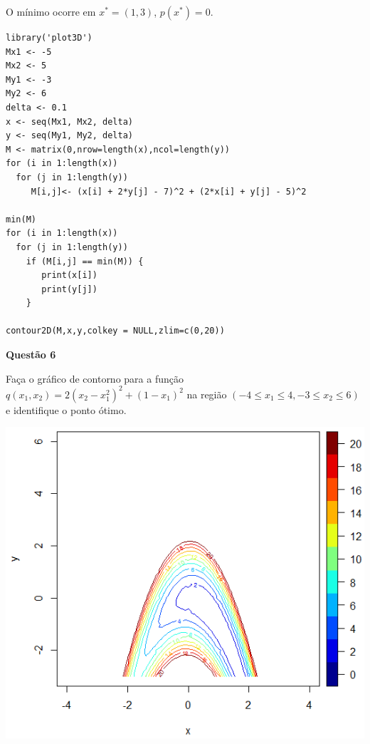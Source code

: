 \documentclass{rbfin}
\begin{document}
O mínimo ocorre em $x^* = (1,3)$, $p(x^*) = 0$.

\singlespacing

\newpage

\begin{verbatim}
library('plot3D')
Mx1 <- -5
Mx2 <- 5
My1 <- -3
My2 <- 6
delta <- 0.1
x <- seq(Mx1, Mx2, delta)
y <- seq(My1, My2, delta)
M <- matrix(0,nrow=length(x),ncol=length(y))
for (i in 1:length(x))
  for (j in 1:length(y))
     M[i,j]<- (x[i] + 2*y[j] - 7)^2 + (2*x[i] + y[j] - 5)^2

min(M)
for (i in 1:length(x))
  for (j in 1:length(y))
    if (M[i,j] == min(M)) {
       print(x[i])
       print(y[j])
    }

contour2D(M,x,y,colkey = NULL,zlim=c(0,20)) 
\end{verbatim}

\vspace{6mm}

\large

\textbf{Questão 6}

\normalsize

\vspace{6mm}

\doublespacing

Faça o gráfico de contorno para a função $q(x_1, x_2) = 2(x_2 - x_1^2)^2 +(1 - x_1)^2$ na região $(-4 \le x_1 \le 4, -3 \le x_2 \le 6)$ e identifique o ponto ótimo.

\begin{center}
\includegraphics[scale=0.666]{q6}
\end{center}
\end{document}
